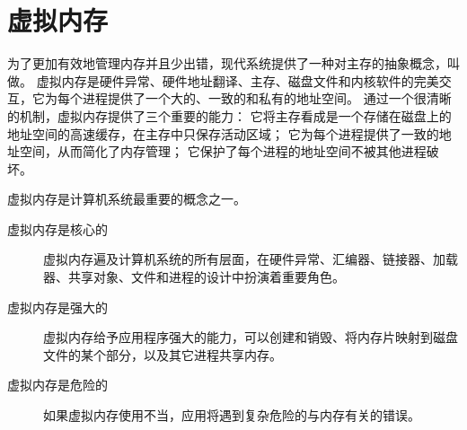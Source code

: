 
\chapter{虚拟内存}
{
    为了更加有效地管理内存并且少出错，现代系统提供了一种对主存的抽象概念，叫做。
    虚拟内存是硬件异常、硬件地址翻译、主存、磁盘文件和内核软件的完美交互，它为每个进程提供了一个大的、一致的和私有的地址空间。
    通过一个很清晰的机制，虚拟内存提供了三个重要的能力：
    它将主存看成是一个存储在磁盘上的地址空间的高速缓存，在主存中只保存活动区域；
    它为每个进程提供了一致的地址空间，从而简化了内存管理；
    它保护了每个进程的地址空间不被其他进程破坏。

    虚拟内存是计算机系统最重要的概念之一。

    \begin{description}
        \item[虚拟内存是核心的] 虚拟内存遍及计算机系统的所有层面，在硬件异常、汇编器、链接器、加载器、共享对象、文件和进程的设计中扮演着重要角色。
        \item[虚拟内存是强大的] 虚拟内存给予应用程序强大的能力，可以创建和销毁、将内存片映射到磁盘文件的某个部分，以及其它进程共享内存。
        \item[虚拟内存是危险的] 如果虚拟内存使用不当，应用将遇到复杂危险的与内存有关的错误。
    \end{description}

    
    
    
    
    
    
}

\cleardoublepage

\endinput

